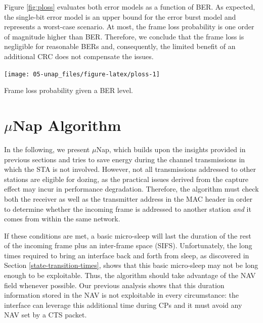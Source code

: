 \documentclass[twoside,nohyper]{tufte-book}
\theoremstyle{definition}
\theoremstyle{definition}
\theoremstyle{definition}
\theoremstyle{remark}
\begin{document}
Figure \ref{fig:ploss} evaluates both error models as a function of BER.
As expected, the single-bit error model is an upper bound for the error
burst model and represents a worst-case scenario. At most, the frame
loss probability is one order of magnitude higher than BER. Therefore,
we conclude that the frame loss is negligible for reasonable BERs and,
consequently, the limited benefit of an additional CRC does not
compensate the issues.



\begin{marginfigure}

{\centering \texttt{[image: 05-unap\_files/figure-latex/ploss-1]} 

}

\caption[Frame loss probability given a BER level.]{Frame loss probability given a BER level.}\label{fig:ploss}
\end{marginfigure}

\section{\texorpdfstring{$\mu$}{\textmu}Nap Algorithm}\label{munap-algorithm}

In the following, we present \(\mu\)Nap, which builds upon the insights
provided in previous sections and tries to save energy during the
channel transmissions in which the STA is not involved. However, not all
transmissions addressed to other stations are eligible for dozing, as
the practical issues derived from the capture effect may incur in
performance degradation. Therefore, the algorithm must check both the
receiver as well as the transmitter address in the MAC header in order
to determine whether the incoming frame is addressed to another station
\emph{and} it comes from within the same network.

If these conditions are met, a basic micro-sleep will last the duration
of the rest of the incoming frame plus an inter-frame space (SIFS).
Unfortunately, the long times required to bring an interface back and
forth from sleep, as discovered in Section \ref{state-transition-times},
shows that this basic micro-sleep may not be long enough to be
exploitable. Thus, the algorithm should take advantage of the NAV field
whenever possible. Our previous analysis shows that this duration
information stored in the NAV is not exploitable in every circumstance:
the interface can leverage this additional time during CPs and it must
avoid any NAV set by a CTS packet.
\end{document}
